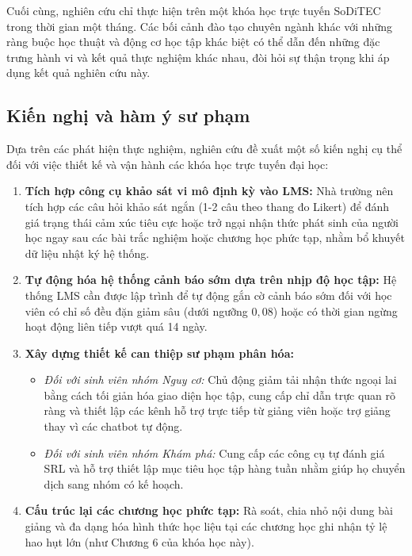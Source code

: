 Cuối cùng, nghiên cứu chỉ thực hiện trên một khóa học trực tuyến SoDiTEC trong thời gian một tháng. Các bối cảnh đào tạo chuyên ngành khác với những ràng buộc học thuật và động cơ học tập khác biệt có thể dẫn đến những đặc trưng hành vi và kết quả thực nghiệm khác nhau, đòi hỏi sự thận trọng khi áp dụng kết quả nghiên cứu này.

\subsection{Kiến nghị và hàm ý sư phạm}

Dựa trên các phát hiện thực nghiệm, nghiên cứu đề xuất một số kiến nghị cụ thể đối với việc thiết kế và vận hành các khóa học trực tuyến đại học:
\begin{enumerate}
    \item \textbf{Tích hợp công cụ khảo sát vi mô định kỳ vào LMS:} Nhà trường nên tích hợp các câu hỏi khảo sát ngắn (1-2 câu theo thang đo Likert) để đánh giá trạng thái cảm xúc tiêu cực hoặc trở ngại nhận thức phát sinh của người học ngay sau các bài trắc nghiệm hoặc chương học phức tạp, nhằm bổ khuyết dữ liệu nhật ký hệ thống.
    \item \textbf{Tự động hóa hệ thống cảnh báo sớm dựa trên nhịp độ học tập:} Hệ thống LMS cần được lập trình để tự động gắn cờ cảnh báo sớm đối với học viên có chỉ số đều đặn giảm sâu (dưới ngưỡng $0,08$) hoặc có thời gian ngừng hoạt động liên tiếp vượt quá 14 ngày.
    \item \textbf{Xây dựng thiết kế can thiệp sư phạm phân hóa:}
    \begin{itemize}
        \item \textit{Đối với sinh viên nhóm Nguy cơ:} Chủ động giảm tải nhận thức ngoại lai bằng cách tối giản hóa giao diện học tập, cung cấp chỉ dẫn trực quan rõ ràng và thiết lập các kênh hỗ trợ trực tiếp từ giảng viên hoặc trợ giảng thay vì các chatbot tự động.
        \item \textit{Đối với sinh viên nhóm Khám phá:} Cung cấp các công cụ tự đánh giá SRL và hỗ trợ thiết lập mục tiêu học tập hàng tuần nhằm giúp họ chuyển dịch sang nhóm có kế hoạch.
    \end{itemize}
    \item \textbf{Cấu trúc lại các chương học phức tạp:} Rà soát, chia nhỏ nội dung bài giảng và đa dạng hóa hình thức học liệu tại các chương học ghi nhận tỷ lệ hao hụt lớn (như Chương 6 của khóa học này).
\end{enumerate}
